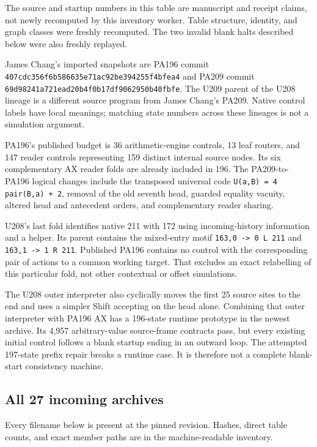 The source and startup numbers in this table are manuscript and receipt
claims, not newly recomputed by this inventory worker. Table structure,
identity, and graph classes were freshly recomputed. The two invalid blank
halts described below were also freshly replayed.

James Chang's imported snapshots are PA196 commit
\nolinkurl{407cdc356f6b586635e71ac92be394255f4bfea4} and PA209 commit
\nolinkurl{69d98241a721ead20b4f0b17df9062950b40fbfe}. The U209 parent of the U208
lineage is a different source program from James Chang's PA209. Native
control labels have local meanings; matching state numbers across these
lineages is not a simulation argument.

PA196's published budget is 36 arithmetic-engine controls, 13 leaf routers,
and 147 reader controls representing 159 distinct internal source nodes.
Its six complementary AX reader folds are already included in 196.
The PA209-to-PA196 logical changes include the transposed universal code
\nolinkurl{U(a,B) = 4 pair(B,a) + 2}, removal of the old seventh head, guarded equality
vacuity, altered head and antecedent orders, and complementary reader sharing.

U208's last fold identifies native 211 with 172 using incoming-history
information and a helper. Its parent contains the mixed-entry motif
\nolinkurl{163,0 -> 0 L 211} and \nolinkurl{163,1 -> 1 R 211}. Published PA196 contains no
control with the corresponding pair of actions to a common working target.
That excludes an exact relabelling of this particular fold, not other
contextual or offset simulations.

The U208 outer interpreter also cyclically moves the first 25 source sites
to the end and uses a simpler Shift accepting on the head alone. Combining
that outer interpreter with PA196 AX has a 196-state runtime prototype in
the newest archive. Its 4,957 arbitrary-value source-frame contracts pass,
but every existing initial control follows a blank startup ending in an
outward loop. The attempted 197-state prefix repair breaks a runtime case.
It is therefore not a complete blank-start consistency machine.

\Needspace{65mm}
\subsection{All 27 incoming archives}

Every filename below is present at the pinned revision. Hashes, direct table
counts, and exact member paths are in the machine-readable inventory.

